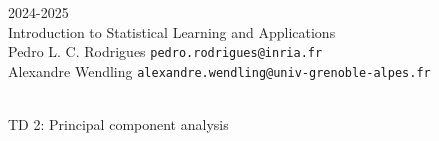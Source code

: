 \begin{flushleft}
 \hfill {} 2024-2025 \\
Introduction to Statistical Learning and Applications \\
Pedro L. C. Rodrigues   \hfill  \texttt{pedro.rodrigues@inria.fr} \\
Alexandre Wendling \hfill \texttt{alexandre.wendling@univ-grenoble-alpes.fr } \\

\HRuleTop\\
\begin{center}
\Large{TD 2: Principal component analysis}
\end{center}
\HRuleBottom
\end{flushleft}
